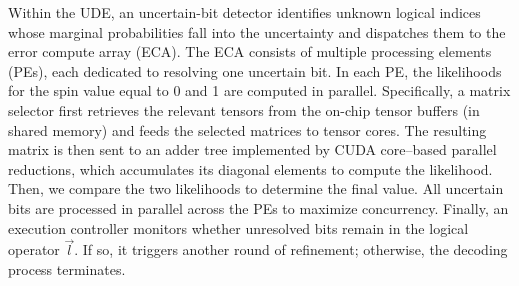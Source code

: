 Within the UDE, an uncertain-bit detector identifies unknown logical indices whose marginal probabilities fall into the uncertainty and dispatches them to the error compute array (ECA). The ECA consists of multiple processing elements (PEs), each dedicated to resolving one uncertain bit. In each PE, the likelihoods for the spin value equal to 0 and 1 are computed in parallel. Specifically, a matrix selector first retrieves the relevant tensors from the on-chip tensor buffers (in shared memory) and feeds the selected matrices to tensor cores. The resulting matrix is then sent to an adder tree implemented by CUDA core–based parallel reductions, which accumulates its diagonal elements to compute the likelihood. Then, we compare the two likelihoods to determine the final value. All uncertain bits are processed in parallel across the PEs to maximize concurrency. Finally, an execution controller monitors whether unresolved bits remain in the logical operator $\vec{l}$. If so, it triggers another round of refinement; otherwise, the decoding process terminates.

